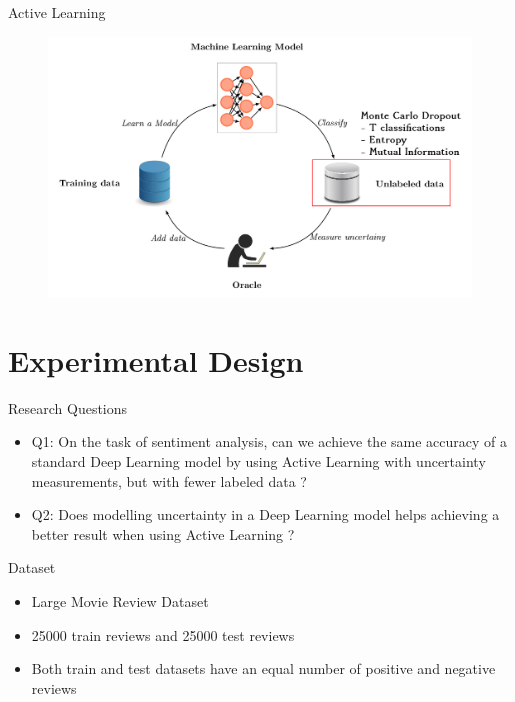 \documentclass[10pt]{beamer}
\begin{document}
\begin{frame}[fragile]{Active Learning}
    \begin{figure}[htp]
        \centering
        \includegraphics[scale=0.3]{images/active_learning_uncertainty_dropout.png}
    \end{figure}
\end{frame}

\section{Experimental Design}

\begin{frame}[fragile]{Research Questions}
\begin{itemize}
    \item \alert{Q1}: On the task of sentiment analysis, can we achieve the same
        accuracy of a standard Deep Learning model by using Active Learning
        with uncertainty measurements, but with fewer labeled data ?
    \vspace{0.5cm}
    \item \alert{Q2}: Does modelling uncertainty in a Deep Learning model helps
        achieving a better result when using Active Learning ?
\end{itemize}
\end{frame}

\begin{frame}[fragile]{Dataset}
\begin{itemize}
    \item Large Movie Review Dataset
    \vspace{0.5cm}
    \item 25000 train reviews and 25000 test reviews
    \vspace{0.5cm}
    \item Both train and test datasets have an equal number of positive and
        negative reviews
\end{itemize}
\end{frame}
\end{document}
